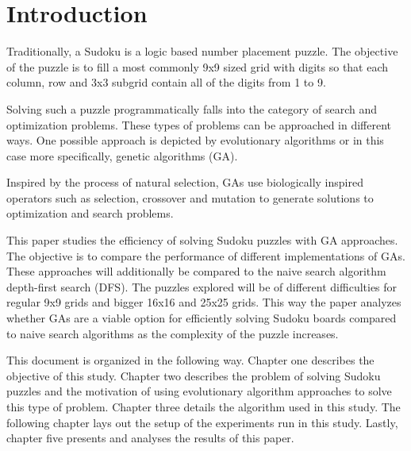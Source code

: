 \section{Introduction}
\label{sec:intro}

Traditionally, a Sudoku is a logic based number placement puzzle. The objective of the puzzle is to fill a most commonly 9x9 sized grid with digits so that each column, row and 3x3 subgrid contain all of the digits from 1 to 9.\cite{}

Solving such a puzzle programmatically falls into the category of search and optimization problems. These types of problems can be approached in different ways. One possible approach is depicted by evolutionary algorithms or in this case more specifically, genetic algorithms (GA)\cite{WikiSudoku}.

Inspired by the process of natural selection, GAs use biologically inspired operators such as selection, crossover and mutation to generate solutions to optimization and search problems\cite{WikiGA}.

This paper studies the efficiency of solving Sudoku puzzles with GA approaches. The objective is to compare the performance of different implementations of GAs. These approaches will additionally be compared to the naive search algorithm depth-first search (DFS). The puzzles explored will be of different difficulties for regular 9x9 grids and bigger 16x16 and 25x25 grids. This way the paper analyzes whether GAs are a viable option for efficiently solving Sudoku boards compared to naive search algorithms as the complexity of the puzzle increases.

This document is organized in the following way. Chapter one describes the objective of this study. Chapter two describes the problem of solving Sudoku puzzles and the motivation of using evolutionary algorithm approaches to solve this type of problem. Chapter three details the algorithm used in this study. The following chapter lays out the setup of the experiments run in this study. Lastly, chapter five presents and analyses the results of this paper.